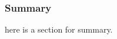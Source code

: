\documentclass[letterpaper, 10pt]{article}
\begin{document}
\begin{small}
%

\subsubsection*{Summary}
here is a section for summary.
\end{small}
\end{document}
